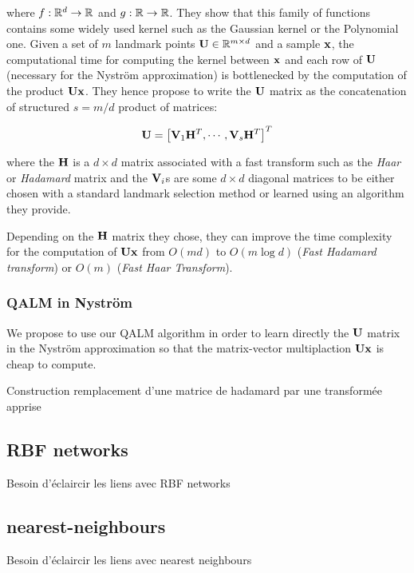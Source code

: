 \documentclass{article}
\begin{document}
where $f: \mathbb{R}^d \rightarrow \mathbb{R}$ and $g: \mathbb{R} \rightarrow \mathbb{R}$. They show that this family of functions contains some widely used kernel such as the Gaussian kernel or the Polynomial one. Given a set of $m$ landmark points ${\mathbf{U}} \in \mathbb{R}^{m \times d}$ and a sample ${\mathbf{x}}$, the computational time for computing the kernel between ${\mathbf{x}}$ and each row of ${\mathbf{U}}$ (necessary for the Nyström approximation) is bottlenecked by the computation of the product ${\mathbf{U}}{\mathbf{x}}$. They hence propose to write the ${\mathbf{U}}$ matrix as the concatenation of structured $s = m / d$ product of matrices:

\begin{equation}
 {\mathbf{U}} = \left[ {\mathbf{V}}_1 {\mathbf{H}}^T, \cdots, {\mathbf{V}}_s{\mathbf{H}}^T  \right]^T
\end{equation}

where the ${\mathbf{H}}$ is a $d \times d$ matrix associated with a fast transform such as the \textit{Haar} or \textit{Hadamard} matrix and the ${\mathbf{V}}_i$s are some $d \times d$ diagonal matrices to be either chosen with a standard landmark selection method or learned using an algorithm they provide.

Depending on the ${\mathbf{H}}$ matrix they chose, they can improve the time complexity for the computation of ${\mathbf{U}}{\mathbf{x}}$ from $O(md)$ to $O(m \log{d})$ (\textit{Fast Hadamard transform}) or $O(m)$ (\textit{Fast Haar Transform}).

\subsubsection{QALM in Nyström}

We propose to use our QALM algorithm in order to learn directly the ${\mathbf{U}}$ matrix in the Nyström approximation so that the matrix-vector multiplaction ${\mathbf{U}} {\mathbf{x}}$ is cheap to compute.

Construction remplacement d'une matrice de hadamard par une transformée apprise

\subsection{RBF networks}

Besoin d'éclaircir les liens avec RBF networks

\subsection{nearest-neighbours}

Besoin d'éclaircir les liens avec nearest neighbours

%
%


\end{document}
